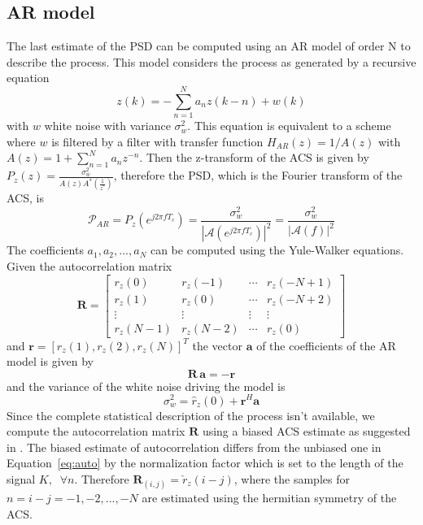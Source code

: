 \documentclass[10pt]{article}
\numberwithin{equation}{section}
\begin{document}
\subsection{AR model}
\label{sec:ar}
The last estimate of the PSD can be computed using an AR model of order N to describe the process. This model considers the process as generated by a recursive equation
\begin{equation}
  z(k) = - \sum_{n=1}^N a_n z(k-n) + w(k)
\end{equation}
with $w$ white noise with variance $\sigma_w^2$. This equation is equivalent to a scheme where $w$ is filtered by a filter with transfer function $H_{AR}(z) = 1/A(z)$ with $A(z) = 1 + \sum_{n=1}^N a_n z^{-n}$. Then the z-transform of the ACS is given by $P_z(z) = \frac{\sigma_w^2}{A(z)A^*(\frac{1}{z^*})}$, therefore the PSD, which is the Fourier transform of the ACS, is
\begin{equation}
  \mathcal{P}_{AR} = P_z(e^{j 2 \pi f T_c}) = \frac{\sigma_w^2}{|\mathcal{A}(e^{j 2 \pi f T_c})|^2} = \frac{\sigma_w^2}{|\mathcal{A}(f)|^2}
  \label{eq:arpsd}
\end{equation}
The coefficients $a_1, a_2, ..., a_N$ can be computed using the Yule-Walker equations. Given the autocorrelation matrix
\begin{equation}
  \mathbf{R} =
  \begin{bmatrix}
     r_z(0) &  r_z(-1) & \cdots &  r_z(-N+1) \\
     r_z(1) &  r_z(0)  & \cdots &  r_z(-N+2) \\
    \vdots       & \vdots        & \vdots & \vdots \\
     r_z(N-1) &  r_z(N-2) & \cdots &  r_z(0)
  \end{bmatrix}
\end{equation}
and $ \mathbf{r} = [r_z(1),  r_z(2),  r_z(N)]^T $ the vector $\mathbf{a}$ of the coefficients of the AR model is given by
\begin{equation}
  \mathbf{R} \, \mathbf{a} = - \mathbf{r}
  \label{eq:yw}
\end{equation}
and the variance of the white noise driving the model is
\begin{equation}
  \sigma_w^2 = \hat{r}_z(0) + \mathbf{r}^H\mathbf{a}
\end{equation}
Since the complete statistical description of the process isn't available, we compute the autocorrelation matrix $\mathbf{R}$ using a biased ACS estimate as suggested in \cite{bc}. The biased estimate of autocorrelation differs from the unbiased one in Equation~\ref{eq:auto} by the normalization factor which is set to the length of the signal $K, \; \; \forall n$. Therefore $\mathbf{R}_{(i, j)} = \check{r}_z(i - j)$, where the samples for $n = i - j=-1, -2, ..., -N$ are estimated using the hermitian symmetry of the ACS. \\
\end{document}
